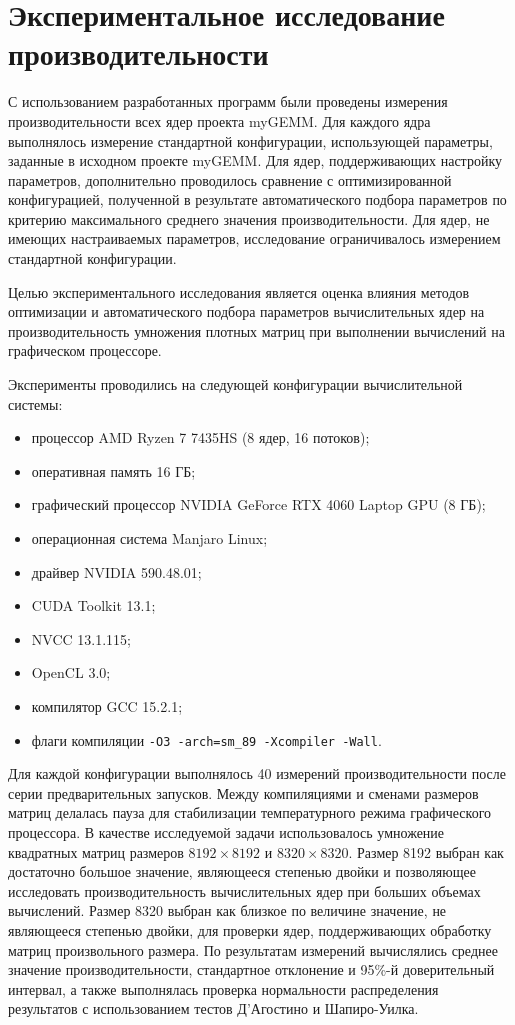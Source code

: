 \documentclass[a4paper]{article}
\begin{document}
\section{Экспериментальное исследование производительности}

С использованием разработанных программ были проведены измерения производительности всех ядер проекта myGEMM. Для каждого ядра выполнялось измерение стандартной конфигурации, использующей параметры, заданные в исходном проекте myGEMM. Для ядер, поддерживающих настройку параметров, дополнительно проводилось сравнение с оптимизированной конфигурацией, полученной в результате автоматического подбора параметров по критерию максимального среднего значения производительности. Для ядер, не имеющих настраиваемых параметров, исследование ограничивалось измерением стандартной конфигурации.

Целью экспериментального исследования является оценка влияния методов оптимизации и автоматического подбора параметров вычислительных ядер на производительность умножения плотных матриц при выполнении вычислений на графическом процессоре.

Эксперименты проводились на следующей конфигурации вычислительной системы:
\begin{itemize}
\item процессор AMD Ryzen 7 7435HS (8 ядер, 16 потоков);
\item оперативная память 16 ГБ;
\item графический процессор NVIDIA GeForce RTX 4060 Laptop GPU (8 ГБ);
\item операционная система Manjaro Linux;
\item драйвер NVIDIA 590.48.01;
\item CUDA Toolkit 13.1;
\item NVCC 13.1.115;
\item OpenCL 3.0;
\item компилятор GCC 15.2.1;
\item флаги компиляции \texttt{-O3 -arch=sm\_89 -Xcompiler -Wall}.
\end{itemize}

Для каждой конфигурации выполнялось 40 измерений производительности после серии предварительных запусков. Между компиляциями и сменами размеров матриц делалась пауза для стабилизации температурного режима графического процессора. В качестве исследуемой задачи использовалось умножение квадратных матриц размеров \(8192 \times 8192\) и \(8320 \times 8320\). Размер 8192 выбран как достаточно большое значение, являющееся степенью двойки и позволяющее исследовать производительность вычислительных ядер при больших объемах вычислений. Размер 8320 выбран как близкое по величине значение, не являющееся степенью двойки, для проверки ядер, поддерживающих обработку матриц произвольного размера. По результатам измерений вычислялись среднее значение производительности, стандартное отклонение и 95\%-й доверительный интервал, а также выполнялась проверка нормальности распределения результатов с использованием тестов Д'Агостино и Шапиро-Уилка.
\end{document}
